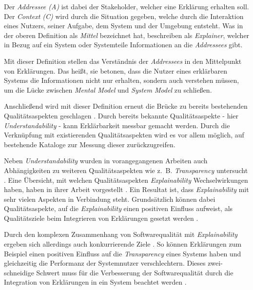 \smallskip

Der \textit{Addressee (A)} ist dabei der Stakeholder, welcher eine Erklärung erhalten soll. Der \textit{Context (C)} wird durch die Situation gegeben, welche durch die Interaktion eines Nutzers, seiner Aufgabe, dem System und der Umgebung entsteht. Was \citeauthor{kohl_explainability_2019} in der oberen Definition als \textit{Mittel} bezeichnet hat, beschreiben \citeauthor{chazette_end-users_nodate} als \textit{Explainer}, welcher in Bezug auf ein 
System oder Systemteile Informationen an die \textit{Addressees} gibt.

Mit dieser Definition stellen \citeauthor{chazette_knowledge_nodate} das Verständnis der \textit{Addressees} in den Mittelpunkt von Erklärungen. Das heißt, sie betonen, dass die Nutzer eines erklärbaren Systems die Informationen nicht nur erhalten, sondern auch verstehen müssen, um die Lücke zwischen \textit{Mental Model} und \textit{System Model} zu schließen.

Anschließend wird mit dieser Definition erneut die Brücke zu bereits bestehenden Qualitätsaspekten geschlagen \cite{chazette_end-users_nodate}. Durch bereits bekannte Qualitätsaspekte - hier \textit{Understandability} - kann Erklärbarkeit messbar gemacht werden. Durch die Verknüpfung mit existierenden Qualitätsaspekten wird es vor allem möglich, auf bestehende Kataloge zur Messung dieser zurückzugreifen.

Neben \textit{Understandability} wurden in vorangegangenen Arbeiten auch Abhängigkeiten zu weiteren Qualitätsaspekten wie z.~B. \textit{Transparency} untersucht \cite{wang_integration_2020}. Eine Übersicht, mit welchen Qualitätsaspekten \textit{Explainability} Wechselwirkungen haben, haben \citeauthor{chazette_knowledge_nodate} in ihrer Arbeit vorgestellt \cite{chazette_knowledge_nodate}. Ein Resultat ist, dass \textit{Explainability} mit sehr vielen Aspekten in Verbindung steht. Grundsätzlich können dabei Qualitätsaspekte, auf die \textit{Explainability} einen positiven Einfluss aufweist, als Qualitätsziele beim Integrieren von Erklärungen gesetzt werden \cite{wang_integration_2020}.

Durch den komplexen Zusammenhang von Softwarequalität mit \textit{Explainability} ergeben sich allerdings auch konkurrierende Ziele \cite{chazette_end-users_nodate}. So können Erklärungen zum Beispiel einen positiven Einfluss auf die \textit{Transparency} eines Systems haben und gleichzeitig die Performanz der Systemnutzer verschlechtern. Dieses zwei-schneidige Schwert muss für die Verbesserung der Softwarequalität durch die Integration von Erklärungen in ein System beachtet werden \cite[vgl.][]{wang_integration_2020}.

